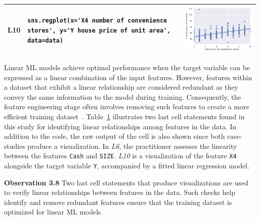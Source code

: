 \documentclass[smallextended]{svjour3}       %
\newcommand{\highlight}[1]{\begin{framed}%
  \noindent#1
\end{framed}}
\begin{document}
\begin{table}
\begin{tabular}{@{}m{} m{} m{}@{}}
		L10                                                                                                                   &
		\lstinline[]$sns.regplot(x='X4 number of convenience stores', y='Y house price of unit area', data=data)$             &
		\includegraphics[width=\linewidth]{linear-relation-check-regplot.png}                                                   \\
		\bottomrule
	\end{tabular}
	\label{tab:linear-relation-check}
\end{table}

Linear ML models achieve optimal performance when the target variable can be expressed as a linear combination of the input features. However, features within a dataset that exhibit a linear relationship are considered redundant as they convey the same information to the model during training. Consequently, the feature engineering stage often involves removing such features to create a more efficient training dataset~\citep{shome2022data}. Table~\ref{tab:linear-relation-check} illustrates two last cell statements found in this study for identifying linear relationships among features in the data. In addition to the code, the raw output of the cell is also shown since both case-studies produce a visualization.  In \emph{L6}, the practitioner assesses the linearity between the features \texttt{Cash} and \texttt{SIZE}. \emph{L10} is a visualization of the feature \texttt{X4} alongside the target variable \texttt{Y}, accompanied by a fitted linear regression model.

\highlight{\textbf{Observation 3.8} Two last cell statements that produce visualizations are used to verify linear relationships between features in the data. Such checks help identify and remove redundant features ensure that the training dataset is optimized for linear ML models.}
\end{document}
